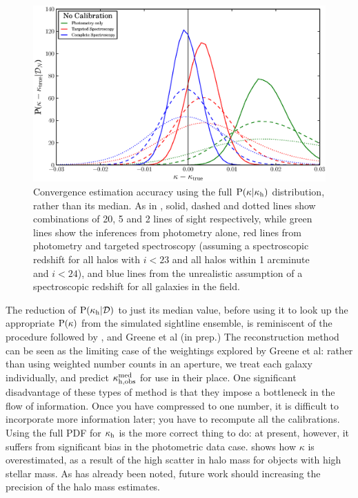\documentclass[useAMS,usenatbib]{mn2e}
\begin{document}
\begin{figure}
\includegraphics[width=\columnwidth]{figs/biasplots3.eps}
\caption{Convergence estimation accuracy using the full  ${\rm P}(\kappa|\kappa_{\rm h})$
distribution, rather than its median.  As in , solid,
dashed and dotted lines show combinations of 20, 5 and 2 lines of sight
respectively, while green lines show the inferences 
from photometry alone, red lines from photometry and targeted spectroscopy 
(assuming a spectroscopic redshift for all
halos with $i<23$ and all halos within 1 arcminute and $i<24$), and blue lines
from the unrealistic assumption of a spectroscopic redshift for all galaxies
in the field. }
\label{fig:no-median-tricks}
\end{figure}

The reduction of ${\rm P}(\kappa_{\rm h}|{\mathcal{D}})$ to just its median value, before using
it to look up the appropriate ${\rm P}(\kappa)$ from the simulated sightline
ensemble, is reminiscent of the procedure followed by \citet{SuyuEtal2010},
and Greene et al (in prep.) The reconstruction method can be seen as the
limiting case of the weightings explored by Greene et al: rather than using
weighted number counts in an aperture, we treat each galaxy individually, and
predict  $\kappa_{\rm h,obs}^{\rm med}$ for use in their place. One
significant disadvantage of these types of method is that they impose a
bottleneck in the flow of information. Once you have compressed to one number,
it is difficult to incorporate more information later; you have to recompute
all the calibrations. Using the full PDF for $\kappa_{\rm h}$ is the more correct
thing to do: at present, however, it suffers from significant bias in the
photometric data case.  shows how $\kappa$ is
overestimated, as a result of the high scatter in halo mass for objects with 
high stellar mass. As has already been noted, 
future work should increasing the precision of the halo
mass estimates. 
\end{document}
